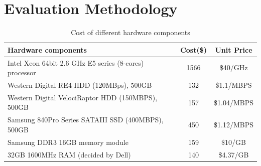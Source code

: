 \documentclass[journal]{IEEEtran}
\begin{document}
\section{Evaluation Methodology}
\begin{table}[!t]
\caption{Cost of different hardware components}
\label{tab:Cost}
\centering
\begin{tabular}{|p{4cm}|c|c|}
\hline
Hardware components & Cost(\$) & Unit Price\\
\hline
Intel Xeon 64bit 2.6 GHz E5 series (8-cores) processor & 1566 & \$40/GHz\\
\hline
Western Digital RE4 HDD (120MBps), 500GB & 132 & \$1.1/MBPS\\
\hline
Western Digital VelociRaptor HDD (150MBPS), 500GB & 157 & \$1.04/MBPS\\
\hline
Samsung 840Pro Series SATAIII SSD (400MBPS), 500GB & 450 & \$1.12/MBPS\\
\hline
Samsung DDR3 16GB memory module & 159 & \$10/GB\\
\hline
32GB 1600MHz RAM (decided by Dell) & 140 & \$4.37/GB\\
\hline
\end{tabular}
\end{table}
\end{document}
